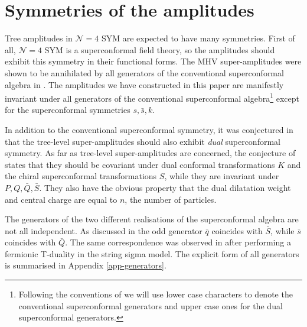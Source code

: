 \documentclass[12pt]{article}
\begin{document}
{%

\section{Symmetries of the amplitudes}\label{sect-app-symmetry}

Tree amplitudes in $\mathcal{N}=4$ SYM are expected to have many
symmetries. First of all, $\mathcal{N}=4$ SYM is a superconformal
field theory, so the amplitudes should exhibit this symmetry in their
functional forms. The MHV super-amplitudes were shown to be
annihilated by all generators of the conventional superconformal
algebra in \cite{Witten:2003nn}. The amplitudes we have constructed in
this paper are manifestly invariant under all generators of the
conventional superconformal algebra\footnote{Following the conventions
  of \cite{dhks5} we will use lower case characters to denote the
  conventional superconformal generators and upper case ones for the
  dual superconformal generators.} except for the superconformal
symmetries $s,\bar s, k$.

 In addition to the conventional superconformal symmetry, it was
 conjectured in \cite{dhks5} that the tree-level super-amplitudes
 should also exhibit {\it dual} superconformal symmetry. As far as
 tree-level super-amplitudes are concerned, the conjecture of
 \cite{dhks5} states that they should be covariant under dual
 conformal transformations $K$ and the chiral superconformal
 transformations $S$, while they are invariant under $P,Q,\bar Q,\bar
 S$. They also have the obvious property that the dual dilatation
 weight and central charge are equal to $n$, the number of particles.

The generators of the two different realisations of the superconformal
algebra are not all independent. As discussed in \cite{dhks5} the odd
generator $\bar q$ coincides with $\bar S$, while $\bar s$ coincides
with $\bar Q$. The same correspondence was observed in
\cite{Berkovits:2008ic,Beisert:2008iq} after performing a fermionic
T-duality in the string sigma model. The explicit form of all
generators is summarised in Appendix \ref{app-generators}.

}
\end{document}
